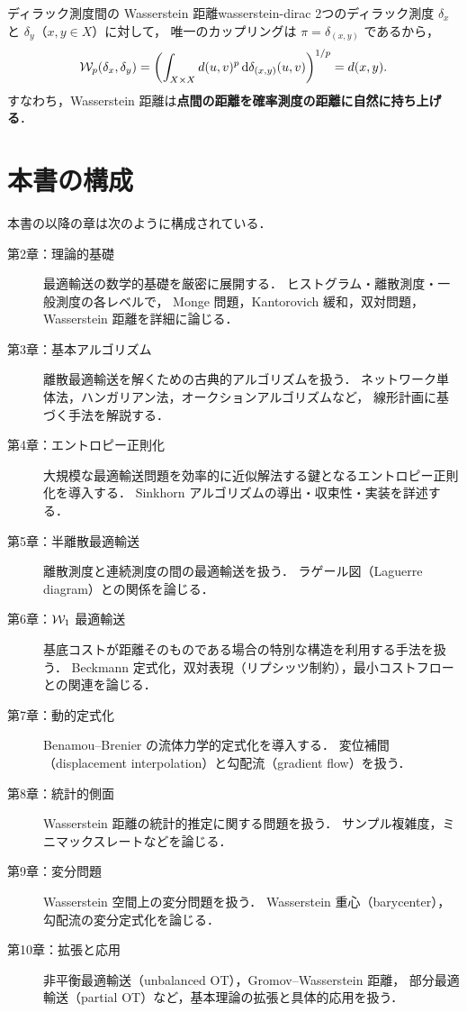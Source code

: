 \begin{example}{ディラック測度間の Wasserstein 距離}{wasserstein-dirac}
  2つのディラック測度 $\delta_x$ と $\delta_y$（$x, y \in X$）に対して，
  唯一のカップリングは $\pi = \delta_{(x,y)}$ であるから，
  \[
    \mathcal{W}_p(\delta_x, \delta_y)
    = \left( \int_{X \times X} d(u, v)^p \, \mathrm{d}\delta_{(x,y)}(u,v) \right)^{1/p}
    = d(x, y).
  \]
  すなわち，Wasserstein 距離は\textbf{点間の距離を確率測度の距離に自然に持ち上げる}．
\end{example}


\section{本書の構成}
\label{sec:book-structure}

本書の以降の章は次のように構成されている．

\begin{description}
  \item[第2章：理論的基礎]
    最適輸送の数学的基礎を厳密に展開する．
    ヒストグラム・離散測度・一般測度の各レベルで，
    Monge 問題，Kantorovich 緩和，双対問題，Wasserstein 距離を詳細に論じる．

  \item[第3章：基本アルゴリズム]
    離散最適輸送を解くための古典的アルゴリズムを扱う．
    ネットワーク単体法，ハンガリアン法，オークションアルゴリズムなど，
    線形計画に基づく手法を解説する．

  \item[第4章：エントロピー正則化]
    大規模な最適輸送問題を効率的に近似解法する鍵となるエントロピー正則化を導入する．
    Sinkhorn アルゴリズムの導出・収束性・実装を詳述する．

  \item[第5章：半離散最適輸送]
    離散測度と連続測度の間の最適輸送を扱う．
    ラゲール図（Laguerre diagram）との関係を論じる．

  \item[第6章：$\mathcal{W}_1$ 最適輸送]
    基底コストが距離そのものである場合の特別な構造を利用する手法を扱う．
    Beckmann 定式化，双対表現（リプシッツ制約），最小コストフローとの関連を論じる．

  \item[第7章：動的定式化]
    Benamou--Brenier の流体力学的定式化を導入する．
    変位補間（displacement interpolation）と勾配流（gradient flow）を扱う．

  \item[第8章：統計的側面]
    Wasserstein 距離の統計的推定に関する問題を扱う．
    サンプル複雑度，ミニマックスレートなどを論じる．

  \item[第9章：変分問題]
    Wasserstein 空間上の変分問題を扱う．
    Wasserstein 重心（barycenter），勾配流の変分定式化を論じる．

  \item[第10章：拡張と応用]
    非平衡最適輸送（unbalanced OT），Gromov--Wasserstein 距離，
    部分最適輸送（partial OT）など，基本理論の拡張と具体的応用を扱う．
\end{description}

